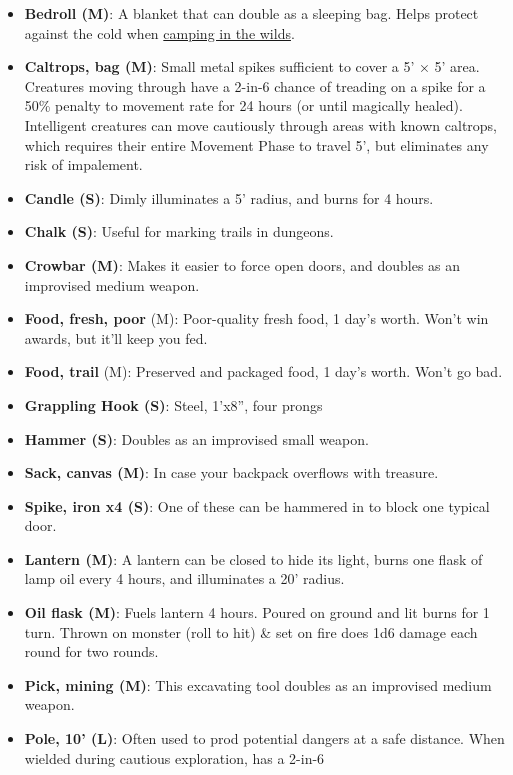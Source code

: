 \documentclass{book}
\providecommand{\tightlist}{%
\setlength{\itemsep}{0pt}\setlength{\parskip}{0pt}}
\begin{document}
\begin{itemize}
\tightlist
\item
  \textbf{Bedroll (M)}: A blanket that can double as a sleeping bag.
  Helps protect against the cold when
  \hyperref[camping-in-the-wilds]{camping in the wilds}.
\item
  \textbf{Caltrops, bag (M)}: Small metal spikes sufficient to cover a
  5' × 5' area. Creatures moving through have a 2-in-6 chance of
  treading on a spike for a 50\% penalty to movement rate for 24 hours
  (or until magically healed). Intelligent creatures can move cautiously
  through areas with known caltrops, which requires their entire
  Movement Phase to travel 5', but eliminates any risk of impalement.
\item
  \textbf{Candle (S)}: Dimly illuminates a 5' radius, and burns for 4
  hours.
\item
  \textbf{Chalk (S)}: Useful for marking trails in dungeons.
\item
  \textbf{Crowbar (M)}: Makes it easier to force open doors, and doubles
  as an improvised medium weapon.
\item
  \textbf{Food, fresh, poor} (M): Poor-quality fresh food, 1 day's
  worth. Won't win awards, but it'll keep you fed.
\item
  \textbf{Food, trail} (M): Preserved and packaged food, 1 day's worth.
  Won't go bad.
\item
  \textbf{Grappling Hook (S)}: Steel, 1'x8'', four prongs
\item
  \textbf{Hammer (S)}: Doubles as an improvised small weapon.
\item
  \textbf{Sack, canvas (M)}: In case your backpack overflows with
  treasure.
\item
  \textbf{Spike, iron x4 (S)}: One of these can be hammered in to block
  one typical door.
\item
  \textbf{Lantern (M)}: A lantern can be closed to hide its light, burns
  one flask of lamp oil every 4 hours, and illuminates a 20' radius.
\item
  \textbf{Oil flask (M)}: Fuels lantern 4 hours. Poured on ground and
  lit burns for 1 turn. Thrown on monster (roll to hit) \& set on fire
  does 1d6 damage each round for two rounds.
\item
  \textbf{Pick, mining (M)}: This excavating tool doubles as an
  improvised medium weapon.
\item
  \textbf{Pole, 10' (L)}: Often used to prod potential dangers at a safe
  distance. When wielded during cautious exploration, has a 2-in-6

\end{itemize}
\end{document}
